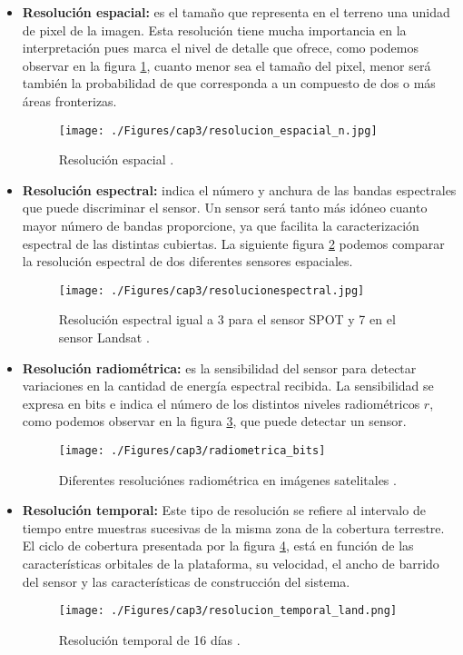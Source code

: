 \begin{itemize}
		\item \textbf{Resoluci\'on espacial:} es el tama\~{n}o que representa en el terreno una unidad de pixel de la imagen. Esta resoluci\'on tiene mucha importancia en la interpretaci\'on pues marca el nivel de detalle que ofrece, como podemos observar en la figura \ref{fig:espatialRes}, cuanto menor sea el tama\~{n}o del pixel, menor ser\'a tambi\'en la probabilidad de que corresponda a un compuesto de dos o m\'as \'areas fronterizas.
		\begin{figure}[H]
			\centering
			\texttt{[image: ./Figures/cap3/resolucion\_espacial\_n.jpg]}
			\caption{Resoluci\'on espacial \cite{chara2015sate}.}
			\label{fig:espatialRes}
		\end{figure}
			\item \textbf{Resoluci\'on espectral:} indica el n\'umero y anchura de las bandas espectrales que puede discriminar el sensor. Un sensor ser\'a tanto m\'as id\'oneo cuanto mayor n\'umero de bandas proporcione, ya que facilita la caracterizaci\'on espectral de las distintas cubiertas. La siguiente figura \ref{fig:espectralRes} podemos comparar la resoluci\'on espectral de dos diferentes sensores espaciales.
				\begin{figure}[H]
					\centering
					\texttt{[image: ./Figures/cap3/resolucionespectral.jpg]}
					\caption{Resoluci\'on espectral igual a 3 para el sensor SPOT y 7 en el sensor Landsat \cite{chara2015sate}.}
					\label{fig:espectralRes}
				\end{figure}
		\item \textbf{Resoluci\'on radiom\'etrica:} es la sensibilidad del sensor para detectar variaciones en la cantidad de energ\'ia espectral recibida. La sensibilidad se expresa en bits e indica el n\'umero de los distintos niveles radiom\'etricos $ r $, como podemos observar en la figura \ref{fig:radioRes}, que puede detectar un sensor.
						\begin{figure}[H]
							\centering
							\texttt{[image: ./Figures/cap3/radiometrica\_bits]}
							\caption{Diferentes resoluci\'ones radiom\'etrica en im\'agenes satelitales .}
							\label{fig:radioRes}
						\end{figure}
		\item \textbf{Resoluci\'on temporal:} Este tipo de resoluci\'on se refiere al intervalo de tiempo entre muestras sucesivas de la misma zona de la cobertura terrestre. El ciclo de cobertura presentada por la figura \ref{fig:temporaRes}, est\'a en funci\'on de las caracter\'isticas orbitales de la plataforma, su velocidad, el ancho de barrido del sensor y las caracter\'isticas de construcci\'on del sistema.
			\begin{figure}[H]
					\centering
					\texttt{[image: ./Figures/cap3/resolucion\_temporal\_land.png]}
					\caption{Resoluci\'on temporal de 16 d\'ias \cite{teledet2015Combi}.}
					\label{fig:temporaRes}
				\end{figure}
	\end{itemize}

